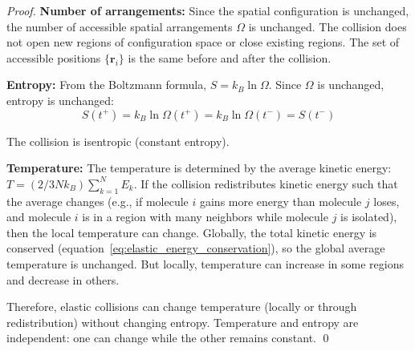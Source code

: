 \documentclass[12pt,a4paper]{article}
\theoremstyle{definition}
\theoremstyle{remark}
\begin{document}
\begin{proof}
\textbf{Number of arrangements:}
Since the spatial configuration is unchanged, the number of accessible spatial arrangements $\Omega$ is unchanged. The collision does not open new regions of configuration space or close existing regions. The set of accessible positions $\{\mathbf{r}_i\}$ is the same before and after the collision.

\textbf{Entropy:}
From the Boltzmann formula, $S = k_B \ln \Omega$. Since $\Omega$ is unchanged, entropy is unchanged:
\begin{equation}
S(t^+) = k_B \ln \Omega(t^+) = k_B \ln \Omega(t^-) = S(t^-)
\end{equation}

The collision is isentropic (constant entropy).

\textbf{Temperature:}
The temperature is determined by the average kinetic energy: $T = (2/3N k_B) \sum_{k=1}^{N} E_k$. If the collision redistributes kinetic energy such that the average changes (e.g., if molecule $i$ gains more energy than molecule $j$ loses, and molecule $i$ is in a region with many neighbors while molecule $j$ is isolated), then the local temperature can change. Globally, the total kinetic energy is conserved (equation~\eqref{eq:elastic_energy_conservation}), so the global average temperature is unchanged. But locally, temperature can increase in some regions and decrease in others.

Therefore, elastic collisions can change temperature (locally or through redistribution) without changing entropy. Temperature and entropy are independent: one can change while the other remains constant. \qed
\end{proof}
\end{document}
